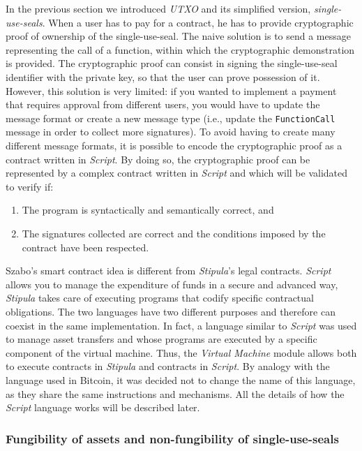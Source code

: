 In the previous section we introduced \textit{UTXO} and its simplified version, \textit{single-use-seals}. 
When a user has to pay for a contract, he has to provide cryptographic proof of ownership of the 
single-use-seal. The naive solution is to send a message representing the call of a function, within which 
the cryptographic demonstration is provided. The cryptographic proof can consist in signing the 
single-use-seal identifier with the private key, so that the user can prove possession of it. However, 
this solution is very limited: if you wanted to implement a payment that requires approval from different 
users, you would have to update the message format or create a new message type (i.e., update the 
\verb|FunctionCall| message in order to collect more signatures). To avoid having to create many different 
message formats, it is possible to encode the cryptographic proof as a contract written in \textit{Script}. 
By doing so, the cryptographic proof can be represented by a complex contract written in \textit{Script} 
and which will be validated to verify if:
\begin{enumerate}
	\item The program is syntactically and semantically correct, and
	\item The signatures collected are correct and the conditions imposed by the contract have been respected.
\end{enumerate}

Szabo's smart contract idea is different from \textit{Stipula}'s legal contracts. \textit{Script} allows you 
to manage the expenditure of funds in a secure and advanced way, \textit{Stipula} takes care of executing 
programs that codify specific contractual obligations. The two languages have two different purposes and 
therefore can coexist in the same implementation. In fact, a language similar to \textit{Script} was used 
to manage asset transfers and whose programs are executed by a specific component of the virtual machine. 
Thus, the \textit{Virtual Machine} module allows both to execute contracts in \textit{Stipula} and contracts 
in \textit{Script}. By analogy with the language used in Bitcoin, it was decided not to change the name of 
this language, as they share the same instructions and mechanisms. All the details of how the 
\textit{Script} language works will be described later.

\subsubsection{Fungibility of assets and non-fungibility of single-use-seals}

